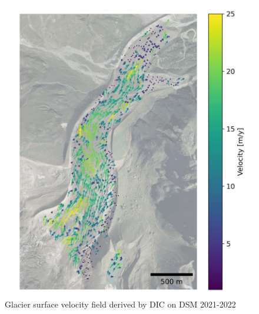 \begin{figure}
    \centering
    \includegraphics[height=\textheight]{figures/chapter3/velocity_DIC_2021-2022.png}
    \caption[]{Glacier surface velocity field derived by DIC on DSM 2021-2022}
\end{figure}

